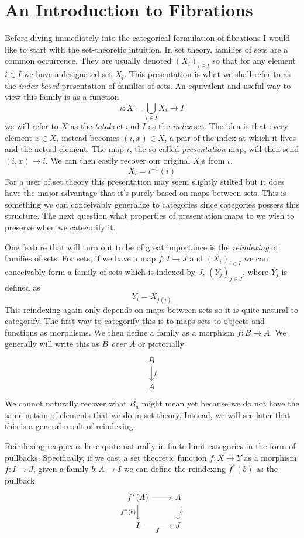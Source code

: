 \section{An Introduction to Fibrations}

Before diving immediately into the categorical formulation of
fibrations I would like to start with the set-theoretic intuition. In
set theory, families of sets are a common occurrence. They are usually
denoted $(X_i)_{i \in I}$ so that for any element $i \in I$ we have a
designated set $X_i$. This presentation is what we shall refer to as
the \emph{index-based} presentation of families of sets. An equivalent
and useful way to view this family is as a function
\[
  \iota : X = \bigcup_{i \in I} X_i \to I
\]
we will refer to $X$ as the \emph{total} set and $I$ as the
\emph{index} set. The idea is that every element $x \in X_i$ instead
becomes $(i, x) \in X$, a pair of the index at which it lives and the
actual element. The map $\iota$, the so called \emph{presentation}
map, will then send $(i, x) \mapsto i$. We can then easily recover our
original $X_i$s from $\iota$.
\[
  X_i = \iota^{-1}(i)
\]
For a user of set theory this presentation may seem slightly stilted
but it does have the major advantage that it's purely based on maps
between sets. This is something we can conceivably generalize to
categories since categories possess this structure. The next question
what properties of presentation maps to we wish to preserve when we
categorify it.

One feature that will turn out to be of great importance is the
\emph{reindexing} of families of sets. For sets, if we have a map
$f : I \to J$ and $(X_i)_{i \in I}$ we can conceivably form a
family of sets which is indexed by $J$, $(Y_j)_{j \in J}$, where $Y_j$
is defined as
\[
  Y_i = X_{f(i)}
\]
This reindexing again only depends on maps between sets so it is quite
natural to categorify. The first way to categorify this is to maps
sets to objects and functions as morphisms. We then define a family as
a morphism $f : B \to A$. We generally will write this as \emph{$B$
  over $A$} or pictorially
\[
  \begin{tikzcd}
    B \ar[d, "f"] \\
    A
  \end{tikzcd}
\]
We cannot naturally recover what $B_a$ might mean yet because we do
not have the same notion of elements that we do in set
theory. Instead, we will see later that this is a general result of
reindexing.

Reindexing reappears here quite naturally in finite limit categories
in the form of pullbacks. Specifically, if we cast a set theoretic
function $f : X \to Y$ as a morphism $f : I \to J$, given a family
$b : A \to I$ we can define the reindexing $f^*(b)$ as the pullback
\[
  \begin{tikzcd}
    f^*(A) \ar[d, swap, "f^*(b)"] \ar[r] & A \ar[d, "b"]\\
    I \ar[r, "f", swap] & J
  \end{tikzcd}
\]

